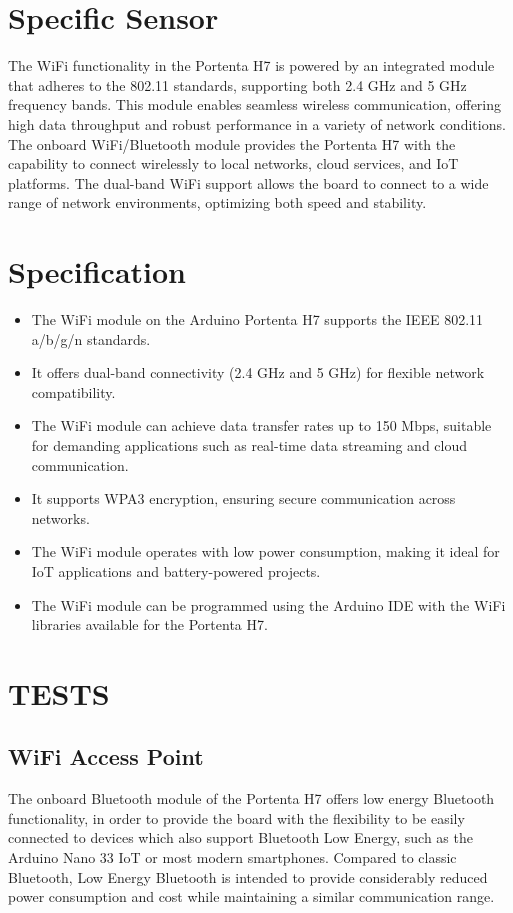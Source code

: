 \section{Specific Sensor}
The WiFi functionality in the Portenta H7 is powered by an integrated module that adheres to the 802.11 standards, supporting both 2.4 GHz and 5 GHz frequency bands. This module enables seamless wireless communication, offering high data throughput and robust performance in a variety of network conditions.
\newline
The onboard WiFi/Bluetooth module provides the Portenta H7 with the capability to connect wirelessly to local networks, cloud services, and IoT platforms. The dual-band WiFi support allows the board to connect to a wide range of network environments, optimizing both speed and stability. \cite{portentaWifiAccessPoint:2024}

\section{Specification}

\begin{itemize}
	
	\item The WiFi module on the Arduino Portenta H7 supports the IEEE 802.11 a/b/g/n standards.
	\item It offers dual-band connectivity (2.4 GHz and 5 GHz) for flexible network compatibility.
	\item The WiFi module can achieve data transfer rates up to 150 Mbps, suitable for demanding applications such as real-time data streaming and cloud communication.
	\item It supports WPA3 encryption, ensuring secure communication across networks.
	\item The WiFi module operates with low power consumption, making it ideal for IoT applications and battery-powered projects.
	\item The WiFi module can be programmed using the Arduino IDE with the WiFi libraries available for the Portenta H7. \cite{portentaWifiAccessPoint:2024}
	
\end{itemize}

\section{TESTS}

\subsection{WiFi Access Point}
The onboard Bluetooth module of the Portenta H7 offers low energy Bluetooth functionality, in order to provide the board with the flexibility to be easily connected to devices which also support Bluetooth Low Energy, such as the Arduino Nano 33 IoT or most modern smartphones. Compared to classic Bluetooth, Low Energy Bluetooth is intended to provide considerably reduced power consumption and cost while maintaining a similar communication range. \cite{portentaWifiAccessPoint:2024} 

